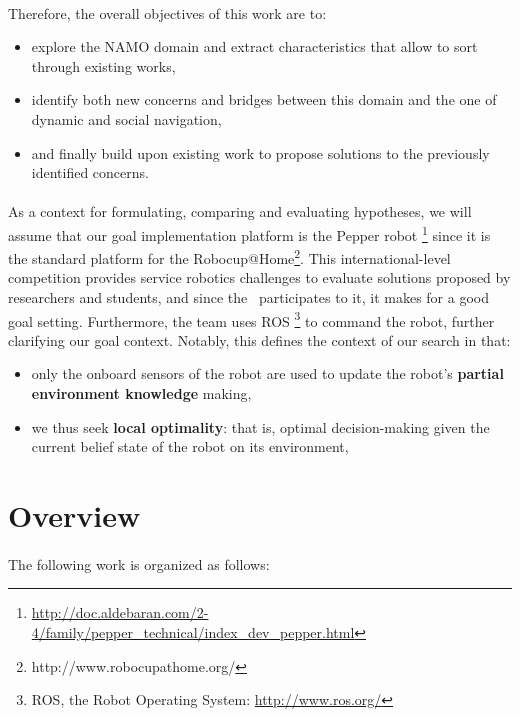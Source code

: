\paragraph{} Therefore, the overall objectives of this work are to:
\begin{itemize}
  \item explore the NAMO domain and extract characteristics that allow to sort through existing works,
  \item identify both new concerns and bridges between this domain and the one of dynamic and social navigation,
  \item and finally build upon existing work to propose solutions to the previously identified concerns.
\end{itemize}

\paragraph{} As a context for formulating, comparing and evaluating hypotheses, we will assume that our goal implementation platform is the Pepper robot \footnote{\url{http://doc.aldebaran.com/2-4/family/pepper_technical/index_dev_pepper.html}} since it is the standard platform for the Robocup@Home\footnote{http://www.robocupathome.org/}. This international-level competition provides service robotics challenges to evaluate solutions proposed by researchers and students, and since the \groupname \, participates to it, it makes for a good goal setting. Furthermore, the team uses ROS \footnote{ROS, the Robot Operating System: \url{http://www.ros.org/}} to command the robot, further clarifying our goal context. Notably, this defines the context of our search in that:
\begin{itemize}
  \item only the onboard sensors of the robot are used to update the robot's \textbf{partial environment knowledge} making,
  \item we thus seek \textbf{local optimality}: that is, optimal decision-making given the current belief state of the robot on its environment,
\end{itemize}

\section{Overview}

\paragraph{} The following work is organized as follows:

